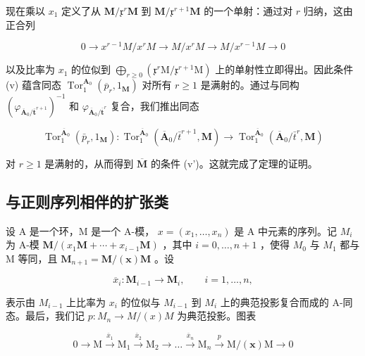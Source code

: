 现在乘以 \(x_{1}\) 定义了从 \(\mathbf{M}/\mathfrak{x}^{r}\mathbf{M}\) 到 \(\mathbf{M}/\mathfrak{x}^{r+1}\mathbf{M}\) 的一个单射：通过对 \(r\) 归纳，这由正合列

\[
0 \rightarrow x ^ {r - 1} M / x ^ {r} M \rightarrow M / x ^ {r} M \rightarrow M / x ^ {r - 1} M \rightarrow 0
\]

以及比率为 \(x_{1}\) 的位似到 \(\bigoplus_{r\geqslant 0}(\mathfrak{x}^{r}\mathrm{M}/\mathfrak{x}^{r+1}\mathrm{M})\) 上的单射性立即得出。因此条件 (v) 蕴含同态 \(\operatorname{Tor}_{1}^{\mathbf{A}_{0}}(\overline{p}_{r},1_{\mathbf{M}})\) 对所有 \(r\geqslant 1\) 是满射的。通过与同构 \((\varphi_{\overline{\mathbf{A}}_{0}/\overline{\mathbf{t}}^{r+1}})^{-1}\) 和 \(\varphi_{\overline{\mathbf{A}}_{0}/\overline{\mathbf{t}}^{r}}\) 复合，我们推出同态

\[
\operatorname{Tor} _ {1} ^ {\overline {{\mathbf {A}}} _ {0}} \left(\bar {p} _ {r}, 1 _ {\mathbf {M}}\right): \operatorname{Tor} _ {1} ^ {\overline {{\mathbf {A}}} _ {0}} \left(\overline {{\mathbf {A}}} _ {0} / \bar {t} ^ {r + 1}, \mathbf {M}\right)\rightarrow \operatorname{Tor} _ {1} ^ {\overline {{\mathbf {A}}} _ {0}} \left(\overline {{\mathbf {A}}} _ {0} / \bar {t} ^ {r}, \mathbf {M}\right)
\]

对 \(r \geqslant 1\) 是满射的，从而得到 \(\overline{\mathbf{M}}\) 的条件 (v')。这就完成了定理的证明。

\subsection{与正则序列相伴的扩张类}

设 A 是一个环，M 是一个 A-模， \(x = (x_{1}, \ldots, x_{n})\) 是 A 中元素的序列。记 \(M_{i}\) 为 A-模 \(\mathbf{M}/(x_{1}\mathbf{M} + \cdots + x_{i-1}\mathbf{M})\) ，其中 \(i = 0, \ldots, n + 1\) ，使得 \(M_{0}\) 与 \(M_{1}\) 都与 M 等同，且 \(\mathbf{M}_{n+1} = \mathbf{M}/(\mathbf{x})\mathbf{M}\) 。设

\[
\overline {{x}} _ {i}: \mathbf {M} _ {i - 1} \to \mathbf {M} _ {i}, \qquad i = 1, \dots , n,
\]

表示由 \(M_{i-1}\) 上比率为 \(x_{i}\) 的位似与 \(M_{i-1}\) 到 \(M_{i}\) 上的典范投影复合而成的 A-同态。最后，我们记 \(p: M_{n} \to M/(x)M\) 为典范投影。图表

\[
0 \longrightarrow \mathrm{M} \xrightarrow {\overline {{{x}}} _ {1}} \mathrm{M} _ {1} \xrightarrow {\overline {{{x}}} _ {2}} \mathrm{M} _ {2} \longrightarrow \dots \xrightarrow {\overline {{{x}}} _ {n}} \mathrm{M} _ {n} \xrightarrow {p} \mathrm{M} / (\boldsymbol {x}) \mathrm{M} \longrightarrow 0\tag{19}
\]

